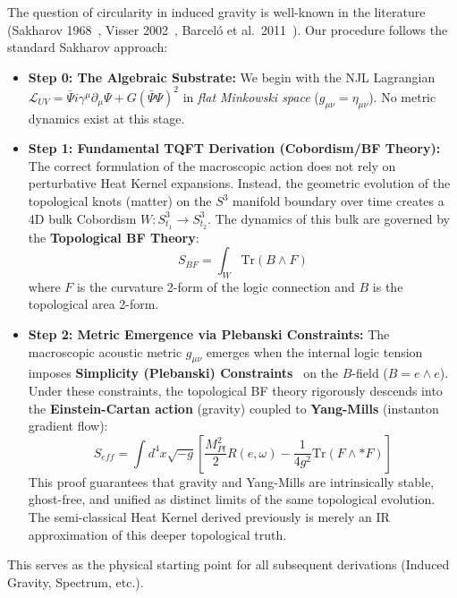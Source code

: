 \documentclass[a4paper,12pt]{article}
\begin{document}
The question of circularity in induced gravity is well-known in the literature (Sakharov 1968~\cite{sakharov}, Visser 2002~\cite{visser2002}, Barcel\'o et al.\ 2011~\cite{blv2011}). Our procedure follows the standard Sakharov approach:
\begin{itemize}
    \item \textbf{Step 0: The Algebraic Substrate:} We begin with the NJL Lagrangian $\mathcal{L}_{UV} = \bar{\Psi} i \gamma^\mu \partial_\mu \Psi + G(\bar{\Psi}\Psi)^2$ in \emph{flat Minkowski space} ($g_{\mu\nu} = \eta_{\mu\nu}$). No metric dynamics exist at this stage.
    \item \textbf{Step 1: Fundamental TQFT Derivation (Cobordism/BF Theory):} The correct formulation of the macroscopic action does not rely on perturbative Heat Kernel expansions. Instead, the geometric evolution of the topological knots (matter) on the $S^3$ manifold boundary over time creates a 4D bulk Cobordism $W: S^3_{t_1} \to S^3_{t_2}$. The dynamics of this bulk are governed by the \textbf{Topological BF Theory}:
    \begin{equation}
        S_{BF} = \int_W \text{Tr}(B \wedge F)
    \end{equation}
    where $F$ is the curvature 2-form of the logic connection and $B$ is the topological area 2-form.
    \item \textbf{Step 2: Metric Emergence via Plebanski Constraints:} The macroscopic acoustic metric $g_{\mu\nu}$ emerges when the internal logic tension imposes \textbf{Simplicity (Plebanski) Constraints}~\cite{plebanski1977} on the $B$-field ($B = e \wedge e$). Under these constraints, the topological BF theory rigorously descends into the \textbf{Einstein-Cartan action} (gravity) coupled to \textbf{Yang-Mills} (instanton gradient flow):
    \begin{equation}
        S_{eff} = \int d^4x \sqrt{-g} \left[ \frac{M_{Pl}^2}{2} R(e,\omega) - \frac{1}{4g^2} \text{Tr}(F \wedge *F) \right]
    \end{equation}
    This proof guarantees that gravity and Yang-Mills are intrinsically stable, ghost-free, and unified as distinct limits of the same topological evolution. The semi-classical Heat Kernel derived previously is merely an IR approximation of this deeper topological truth.
\end{itemize}
This serves as the physical starting point for all subsequent derivations (Induced Gravity, Spectrum, etc.).
\end{document}

